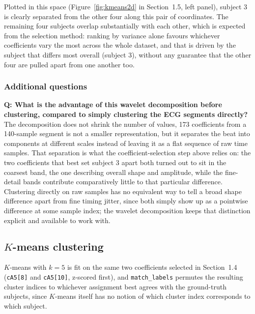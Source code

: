 \documentclass[11pt,a4paper]{article}
\newcommand{\num}[1]{#1}
\begin{document}
Plotted in this space (Figure~\ref{fig:kmeans2d} in Section~1.5, left panel), subject 3 is
clearly separated from the other four along this pair of coordinates. The remaining four
subjects overlap substantially with each other, which is expected from the selection method:
ranking by variance alone favours whichever coefficients vary the most across the whole
dataset, and that is driven by the subject that differs most overall (subject 3), without any
guarantee that the other four are pulled apart from one another too.

\subsubsection{Additional questions}

\textbf{Q: What is the advantage of this wavelet decomposition before clustering, compared to
simply clustering the ECG segments directly?} The decomposition does not shrink the number of
values, \num{173} coefficients from a \num{140}-sample segment is not a smaller representation,
but it separates the beat into components at different scales instead of leaving it as a flat
sequence of raw time samples. That separation is what the coefficient-selection step above
relies on: the two coefficients that best set subject 3 apart both turned out to sit in the
coarsest band, the one describing overall shape and amplitude, while the fine-detail bands
contribute comparatively little to that particular difference. Clustering directly on raw
samples has no equivalent way to tell a broad shape difference apart from fine timing jitter,
since both simply show up as a pointwise difference at some sample index; the wavelet
decomposition keeps that distinction explicit and available to work with.

\subsection{$K$-means clustering}

$K$-means with $k=5$ is fit on the same two coefficients selected in Section~1.4
(\texttt{cA5[8]} and \texttt{cA5[10]}, z-scored first), and \texttt{match\_labels} permutes the
resulting cluster indices to whichever assignment best agrees with the ground-truth subjects,
since $K$-means itself has no notion of which cluster index corresponds to which subject.
\end{document}

